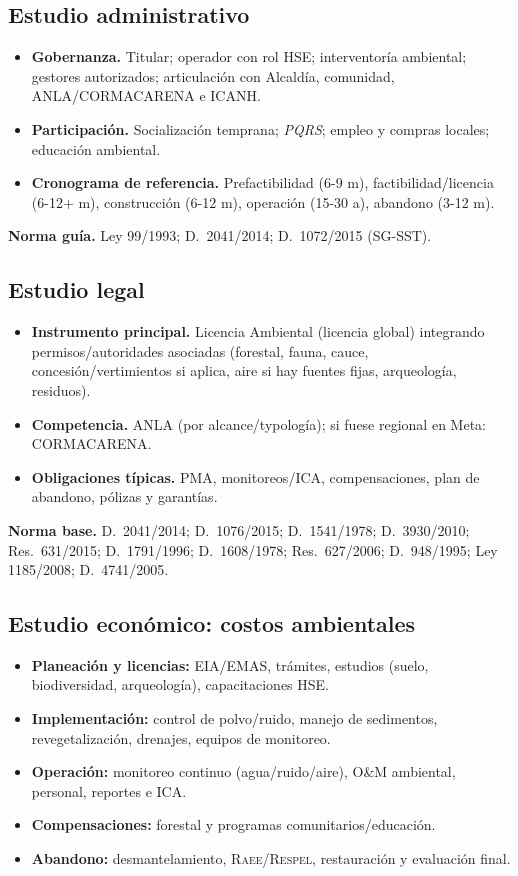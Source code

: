 \subsection{Estudio administrativo}
\begin{itemize}
  \item \textbf{Gobernanza.} Titular; operador con rol HSE; interventoría ambiental; gestores autorizados; articulación con Alcaldía, comunidad, ANLA/CORMACARENA e ICANH.
  \item \textbf{Participación.} Socialización temprana; \emph{PQRS}; empleo y compras locales; educación ambiental.
  \item \textbf{Cronograma de referencia.} Prefactibilidad (6-9 m), factibilidad/licencia (6-12+ m), construcción (6-12 m), operación (15-30 a), abandono (3-12 m).
\end{itemize}
\textbf{Norma guía.} Ley 99/1993; D.~2041/2014; D.~1072/2015 (SG-SST).

\subsection{Estudio legal}
\begin{itemize}
  \item \textbf{Instrumento principal.} Licencia Ambiental (licencia global) integrando permisos/autoridades asociadas (forestal, fauna, cauce, concesión/vertimientos si aplica, aire si hay fuentes fijas, arqueología, residuos).
  \item \textbf{Competencia.} ANLA (por alcance/typología); si fuese regional en Meta: CORMACARENA.
  \item \textbf{Obligaciones típicas.} PMA, monitoreos/ICA, compensaciones, plan de abandono, pólizas y garantías.
\end{itemize}

\textbf{Norma base.} D.~2041/2014; D.~1076/2015; D.~1541/1978; D.~3930/2010; Res.~631/2015; D.~1791/1996; D.~1608/1978; Res.~627/2006; D.~948/1995; Ley 1185/2008; D.~4741/2005.

\subsection{Estudio económico: costos ambientales}
\begin{itemize}
\item \textbf{Planeación y licencias:} EIA/EMAS, trámites, estudios (suelo, biodiversidad, arqueología), capacitaciones HSE.
\item \textbf{Implementación:} control de polvo/ruido, manejo de sedimentos, revegetalización, drenajes, equipos de monitoreo.
\item \textbf{Operación:} monitoreo continuo (agua/ruido/aire), O\&M ambiental, personal, reportes e ICA.
\item \textbf{Compensaciones:} forestal y programas comunitarios/educación.
\item \textbf{Abandono:} desmantelamiento, \textsc{Raee}/\textsc{Respel}, restauración y evaluación final.
\end{itemize}

